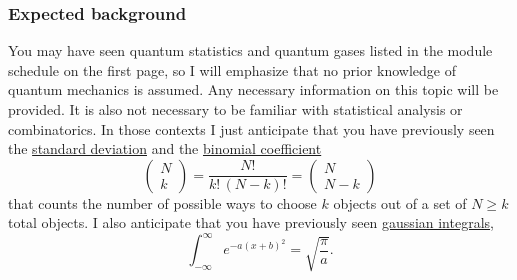 \subsubsection*{Expected background}
You may have seen quantum statistics and quantum gases listed in the module schedule on the first page, so I will emphasize that no prior knowledge of quantum mechanics is assumed.
Any necessary information on this topic will be provided.
%
It is also not necessary to be familiar with statistical analysis or combinatorics.
In those contexts I just anticipate that you have previously seen the \href{https://en.wikipedia.org/wiki/Standard_deviation}{standard deviation} and the \href{https://en.wikipedia.org/wiki/Binomial_coefficient}{binomial coefficient}
\begin{equation*}
  \left(\begin{array}{c}N \\ k\end{array}\right) = \frac{N!}{k! \, (N - k)!} = \left(\begin{array}{c}N \\ N - k\end{array}\right)
\end{equation*}
that counts the number of possible ways to choose $k$ objects out of a set of $N \geq k$ total objects.
I also anticipate that you have previously seen \href{https://en.wikipedia.org/wiki/Gaussian_integral}{gaussian integrals},
\begin{equation*}
  \int_{-\infty}^{\infty} e^{-a (x + b)^2} = \sqrt{\frac{\pi}{a}}.
\end{equation*}



